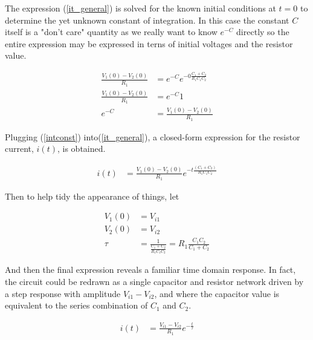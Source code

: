 \documentclass[12pt,letterpaper]{report}
\begin{document}
	The expression (\ref{it_general}) is solved for the known initial conditions at $t=0$ to determine the yet unknown constant of integration.  In this case the constant $C$ itself is a "don't care" quantity as we really want to know $e^{-C}$ directly so the entire expression may be expressed in terns of initial voltages and the resistor value.
	
	\begin{align}
		\frac{V_1(0) - V_2(0)}{R_1} &=  e^{-C} e^{-0  \frac{C_1 + C_2}{R_1 C_1 C_2}} \nonumber \\
		 \frac{V_1(0) - V_2(0)}{R_1} &=  e^{-C} 1 \nonumber \\
		 e^{-C} &= \frac{V_1(0) - V_2(0)}{R_1} \label{intconst}
	\end{align}

	Plugging (\ref{intconst}) into(\ref{it_general}), a closed-form expression for the resistor current, $i(t)$, is obtained.
	
	\begin{align}
		i(t) &= \frac{V_1(0) - V_2(0)}{R_1}  e^{-t \frac{(C_1 + C_2)}{R_1 C_1 C_2}} 
	\end{align}
	
	Then to help tidy the appearance of things, let
	
	\begin{align}
		V_1(0) &= V_{i1} \\
		V_2(0) &= V_{i2} \\
		\tau &= \frac{1}{ \frac{C_1 + C_2}{R_1 C_1 C_2} } = R_1 \frac{C_1 C_2}{C_1 + C_2}
	\end{align}

	And then the final expression reveals a familiar time domain response. In fact, the circuit could be redrawn as a single capacitor and resistor network driven by a step response with amplitude $V_{i1} - V_{i2}$, and where the capacitor value is equivalent to the series combination of $C_1$ and $C_2$.
	
	\begin{align}
	i(t) &= \frac{V_{i1} - V_{i2}}{R_1}  e^{-\frac{t}{\tau}} 
	\end{align}
	
\end{document}
